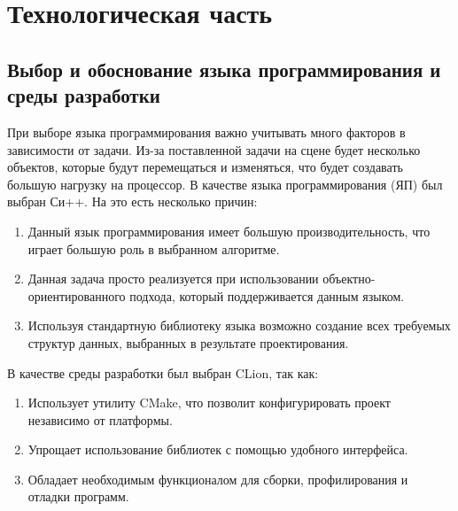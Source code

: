 \chapter{Технологическая часть}
\section{Выбор и обоснование языка программирования и среды разработки}
При выборе языка программирования важно учитывать много факторов в 
зависимости от задачи. Из-за поставленной задачи на сцене будет несколько объектов, которые будут
перемещаться и изменяться, что будет создавать большую нагрузку на процессор.
В качестве языка программирования (ЯП) был выбран Си++. На это есть 
несколько причин:
\begin{enumerate}
    \item Данный язык программирования имеет большую производительность, что играет большую роль в выбранном алгоритме.
    \item Данная задача просто реализуется при использовании объектно-ориентированного подхода, который поддерживается данным языком.
    \item Используя стандартную библиотеку языка возможно создание всех требуемых структур данных, выбранных в результате проектирования.
\end{enumerate}
В качестве среды разработки был выбран CLion, так как:
\begin{enumerate}
    \item Использует утилиту CMake, что позволит конфигурировать проект независимо от платформы.
    \item Упрощает использование библиотек с помощью удобного интерфейса.
    \item Обладает необходимым функционалом для сборки, профилирования и отладки программ.
\end{enumerate}



